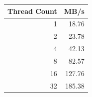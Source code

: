 \begin{tabular}{rr}
\toprule
Thread Count & MB/s \\
\midrule
1 & 18.76 \\
2 & 23.78 \\
4 & 42.13 \\
8 & 82.57 \\
16 & 127.76 \\
32 & 185.38 \\
\bottomrule
\end{tabular}
